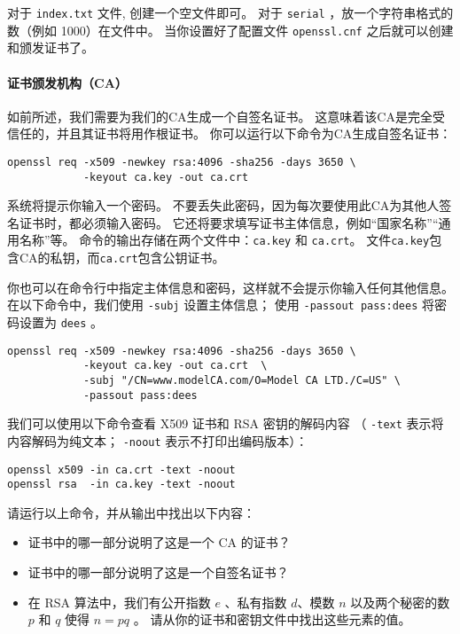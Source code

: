 对于 \texttt{index.txt} 文件, 创建一个空文件即可。
对于 \texttt{serial} ，放一个字符串格式的数（例如 1000）在文件中。
当你设置好了配置文件 \texttt{openssl.cnf} 之后就可以创建和颁发证书了。


\paragraph{证书颁发机构（CA）}
如前所述，我们需要为我们的CA生成一个自签名证书。
这意味着该CA是完全受信任的，并且其证书将用作根证书。
你可以运行以下命令为CA生成自签名证书：

\begin{lstlisting}
openssl req -x509 -newkey rsa:4096 -sha256 -days 3650 \
            -keyout ca.key -out ca.crt
\end{lstlisting}

系统将提示你输入一个密码。
不要丢失此密码，因为每次要使用此CA为其他人签名证书时，都必须输入密码。
它还将要求填写证书主体信息，例如“国家名称”“通用名称”等。
命令的输出存储在两个文件中：{\tt ca.key} 和 {\tt ca.crt}。
文件{\tt ca.key}包含CA的私钥，而{\tt ca.crt}包含公钥证书。


你也可以在命令行中指定主体信息和密码，这样就不会提示你输入任何其他信息。
在以下命令中，我们使用 \texttt{-subj} 设置主体信息；
使用 \texttt{-passout pass:dees} 将密码设置为 \texttt{dees} 。

\begin{lstlisting}
openssl req -x509 -newkey rsa:4096 -sha256 -days 3650 \
            -keyout ca.key -out ca.crt  \
            -subj "/CN=www.modelCA.com/O=Model CA LTD./C=US" \
            -passout pass:dees
\end{lstlisting}


我们可以使用以下命令查看 X509 证书和 RSA 密钥的解码内容
（ \texttt{-text} 表示将内容解码为纯文本； \texttt{-noout} 表示不打印出编码版本）：

\begin{lstlisting}
openssl x509 -in ca.crt -text -noout
openssl rsa  -in ca.key -text -noout
\end{lstlisting}

请运行以上命令，并从输出中找出以下内容：

\begin{itemize}[noitemsep]
   \item 证书中的哪一部分说明了这是一个 CA 的证书？
   \item 证书中的哪一部分说明了这是一个自签名证书？
   \item 在 RSA 算法中，我们有公开指数 $e$ 、私有指数 $d$、模数 $n$
         以及两个秘密的数 $p$ 和 $q$ 使得 $n = pq$ 。
         请从你的证书和密钥文件中找出这些元素的值。
\end{itemize}


